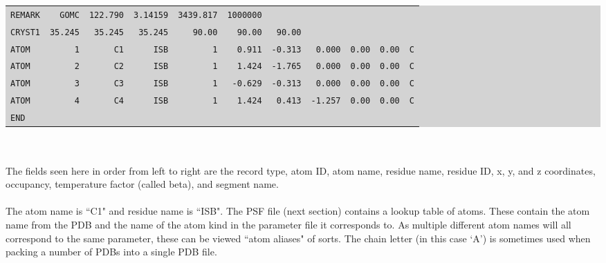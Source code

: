 \colorbox{lightgray}{
\begin{tabular}{l *{10}{r}}
  \texttt{REMARK} & \texttt{GOMC} &  \texttt{122.790} &  \texttt{3.14159} &   \texttt{3439.817} &   \texttt{1000000} & & &  & & \\
  \texttt{CRYST1} & \texttt{35.245} & \texttt{35.245} & \texttt{35.245} & \texttt{90.00} & \texttt{90.00} & \texttt{90.00} & & &  & \\
  \texttt{ATOM} & \texttt{1} & \texttt{C1} & \texttt{ISB} & \texttt{1} & \texttt{0.911} & \texttt{-0.313} & \texttt{0.000} & \texttt{0.00} & \texttt{0.00} & \texttt{C} \\
  \texttt{ATOM} & \texttt{2} & \texttt{C2} & \texttt{ISB} & \texttt{1} & \texttt{1.424} & \texttt{-1.765} & \texttt{0.000} & \texttt{0.00} & \texttt{0.00} & \texttt{C} \\
  \texttt{ATOM} & \texttt{3} & \texttt{C3} & \texttt{ISB} & \texttt{1} & \texttt{-0.629} & \texttt{-0.313} & \texttt{0.000} & \texttt{0.00} & \texttt{0.00} & \texttt{C} \\
  \texttt{ATOM} & \texttt{4} & \texttt{C4} & \texttt{ISB} & \texttt{1} & \texttt{1.424} & \texttt{0.413} & \texttt{-1.257} & \texttt{0.00} & \texttt{0.00} & \texttt{C} \\
  \multicolumn{11}{l}{\texttt{END}} \\
\end{tabular} 
} \\\\

The fields seen here in order from left to right are the record type, atom ID, atom name, residue name, residue ID, x, y, and z coordinates, occupancy, temperature factor (called beta), and segment name.\\\\
The atom name is ``C1" and residue name is ``ISB". The PSF file (next section) contains a lookup table of atoms. These contain the atom name from the PDB and the name of the atom kind in the parameter file it corresponds to. As multiple different atom names will all correspond to the same parameter, these can be viewed ``atom aliases" of sorts.  The chain letter (in this case `A') is sometimes used when packing a number of PDBs into a single PDB file.\\

